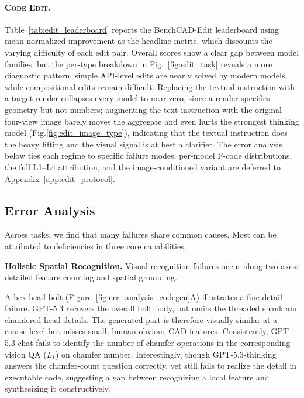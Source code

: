\paragraph{\textsc{Code Edit}.} 
Table~\ref{tab:edit_leaderboard} reports the BenchCAD-Edit leaderboard using mean-normalized improvement as the headline metric, which discounts the varying difficulty of each edit pair. Overall scores show a clear gap between model families, but the per-type breakdown in Fig.~\ref{fig:edit_task} reveals a more diagnostic pattern: simple API-level edits are nearly solved by modern models, while compositional edits remain difficult. Replacing the textual instruction with a target render collapses every model to near-zero, since a render specifies geometry but not numbers; augmenting the text instruction with the original four-view image barely moves the aggregate and even hurts the strongest thinking model (Fig.\ref{fig:edit_image_type}), indicating that the textual instruction does the heavy lifting and the visual signal is at best a clarifier. The error analysis below ties each regime to specific failure modes; per-model F-code distributions, the full L1--L4 attribution, and the image-conditioned variant are deferred to Appendix~\ref{app:edit_protocol}.


\subsection{Error Analysis}
\label{sec:results_failure_analysis}
\label{sec:exp_failure_analysis}


Across tasks, we find that many failures share common causes. Most can be attributed to deficiencies in three core capabilities.


\textbf{Holistic Spatial Recognition.}
Visual recognition failures occur along two axes: detailed feature counting and spatial grounding.
%

A hex-head bolt (Figure~\ref{fig:err_analysis_codegen}A) illustrates a fine-detail failure. 
GPT-5.3 recovers the overall bolt body, but omits the threaded shank and chamfered head details. 
The generated part is therefore visually similar at a coarse level but misses small, human-obvious CAD features. 
Consistently, GPT-5.3-chat fails to identify the number of chamfer operations in the corresponding vision QA ($L_1$) on chamfer number. Interestingly, though GPT-5.3-thinking answers the chamfer-count question correctly, yet still fails to realize the detail in executable code, suggesting a gap between recognizing a local feature and synthesizing it constructively.


